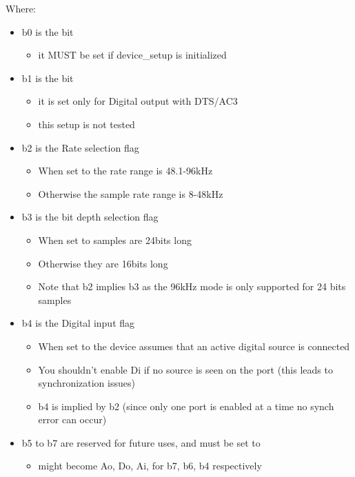 \documentclass[a4paper,8pt,english]{sphinxmanual}
\begin{document}
Where:
\begin{itemize}
\item {} 
b0 is the  bit
\begin{itemize}
\item {} 
it MUST be set if device\_setup is initialized

\end{itemize}

\item {} 
b1 is the  bit
\begin{itemize}
\item {} 
it is set only for Digital output with DTS/AC3

\item {} 
this setup is not tested

\end{itemize}

\item {} 
b2 is the Rate selection flag
\begin{itemize}
\item {} 
When set to  the rate range is 48.1-96kHz

\item {} 
Otherwise the sample rate range is 8-48kHz

\end{itemize}

\item {} 
b3 is the bit depth selection flag
\begin{itemize}
\item {} 
When set to  samples are 24bits long

\item {} 
Otherwise they are 16bits long

\item {} 
Note that b2 implies b3 as the 96kHz mode is only supported for 24 bits
samples

\end{itemize}

\item {} 
b4 is the Digital input flag
\begin{itemize}
\item {} 
When set to  the device assumes that an active digital source is
connected

\item {} 
You shouldn't enable Di if no source is seen on the port (this leads to
synchronization issues)

\item {} 
b4 is implied by b2 (since only one port is enabled at a time no synch
error can occur)

\end{itemize}

\item {} 
b5 to b7 are reserved for future uses, and must be set to 
\begin{itemize}
\item {} 
might become Ao, Do, Ai, for b7, b6, b4 respectively

\end{itemize}

\end{itemize}
\end{document}
